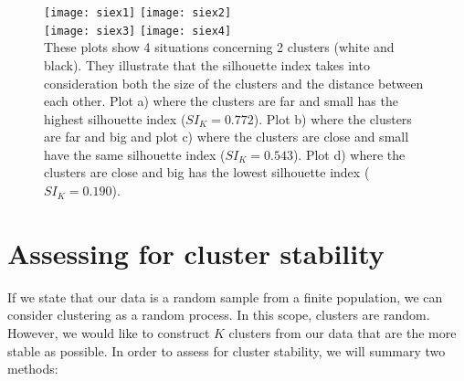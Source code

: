 \begin{figure}
\captionsetup{singlelinecheck = false, format= hang, justification=raggedright, font=small, labelsep=space}
\texttt{[image: siex1]} \hfill
\texttt{[image: siex2]} \\
\texttt{[image: siex3]} \hfill
\texttt{[image: siex4]} \\
\label{fig:silex}
{\footnotesize These plots show 4 situations concerning 2 clusters (white and black). They illustrate that the silhouette index takes into consideration both the size of the clusters and the distance between each other. Plot a) where the clusters are far and small has the highest silhouette index ($SI_K=0.772$). Plot b) where the clusters are far and big and plot c) where the clusters are close and small have the same silhouette index ($SI_K=0.543$). Plot d) where the clusters are close and big has the lowest silhouette index ($SI_K=0.190$).}
\end{figure}


\section{Assessing for cluster stability}
If we state that our data is a random sample from a finite population, we can consider clustering as a random process. In this scope, clusters are random. However, we would like to construct $K$ clusters from our data that are the more stable as possible. In order to assess for cluster stability, we will summary two methods:

